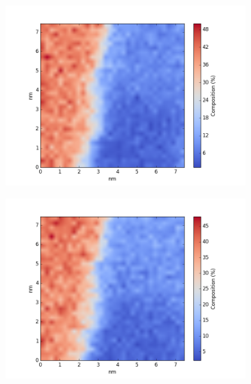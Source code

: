 \begin{figure}
	\centering
	\begin{subfigure}{0.45\textwidth}
		\includegraphics[width=\textwidth]{fig/q/E_heated/_binned_As_zetaAbs}
		\caption{}
		\label{fig:Eas}
	\end{subfigure}%
	\hfill
	\begin{subfigure}{0.45\textwidth}
		\includegraphics[width=\textwidth]{fig/q/E_heated/_binned_Ga_zetaAbs}
		\caption{}
		\label{fig:Ega}
	\end{subfigure}
	\centering
	\begin{subfigure}{0.45\textwidth}

\end{subfigure}
\end{figure}
